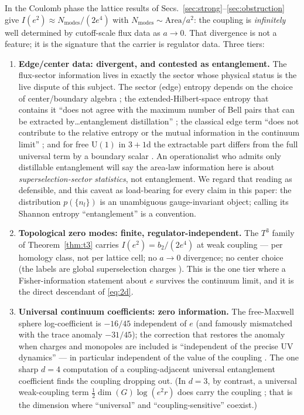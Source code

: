 \documentclass[11pt]{article}
\theoremstyle{remark}
\theoremstyle{plain}
\begin{document}
In the Coulomb phase the lattice results of Secs.~\ref{sec:strong}--\ref{sec:obstruction} give $I(e^2) \approx N_{\mathrm{modes}}/(2e^4)$ with $N_{\mathrm{modes}} \sim \mathrm{Area}/a^2$: the coupling is \emph{infinitely} well determined by cutoff-scale flux data as $a \to 0$. That divergence is not a feature; it is the signature that the carrier is regulator data. Three tiers:

\begin{enumerate}
\item \textbf{Edge/center data: divergent, and contested as entanglement.} The flux-sector information lives in exactly the sector whose physical status is the live dispute of this subject. The sector (edge) entropy depends on the choice of center/boundary algebra \cite{CHR}; the extended-Hilbert-space entropy that contains it ``does not agree with the maximum number of Bell pairs that can be extracted by\ldots entanglement distillation'' \cite{GST15, ST15}; the classical edge term ``does not contribute to the relative entropy or the mutual information in the continuum limit'' \cite{MST18}; and for free $\mathrm{U}(1)$ in $3{+}1$d the extractable part differs from the full universal term by a boundary scalar \cite{ST16}. An operationalist who admits only distillable entanglement will say the area-law information here is about \emph{superselection-sector statistics}, not entanglement. We regard that reading as defensible, and this caveat as load-bearing for every claim in this paper: the distribution $p(\{n_l\})$ is an unambiguous gauge-invariant object; calling its Shannon entropy ``entanglement'' is a convention.
\item \textbf{Topological zero modes: finite, regulator-independent.} The $T^3$ family of Theorem~\ref{thm:t3} carries $I(e^2) = b_2/(2e^4)$ at weak coupling --- per homology class, not per lattice cell; no $a \to 0$ divergence; no center choice (the labels are global superselection charges \cite{tHooft79}). This is the one tier where a Fisher-information statement about $e$ survives the continuum limit, and it is the direct descendant of \eqref{eq:2d}.
\item \textbf{Universal continuum coefficients: zero information.} The free-Maxwell sphere log-coefficient is $-16/45$ independent of $e$ \cite{CH15} (and famously mismatched with the trace anomaly $-31/45$); the correction that restores the anomaly when charges and monopoles are included is ``independent of the precise UV dynamics'' --- in particular independent of the value of the coupling \cite{CHMP}. The one sharp $d = 4$ computation of a coupling-adjacent universal entanglement coefficient finds the coupling dropping out. (In $d = 3$, by contrast, a universal weak-coupling term $\tfrac12 \dim(G) \log(e^2 r)$ does carry the coupling \cite{R15}; that is the dimension where ``universal'' and ``coupling-sensitive'' coexist.)
\end{enumerate}
\end{document}
